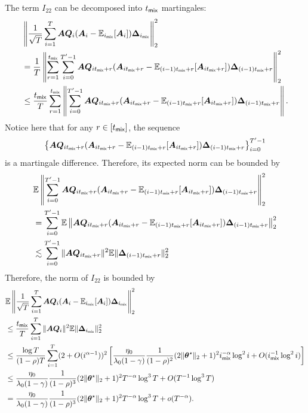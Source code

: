 The term $I_{22}$ can be decomposed into $t_{\mathsf{mix}}$ martingales:%
\begin{align*}
&\left\|\frac{1}{\sqrt{T}}\sum_{i=1}^T \bm{AQ}_i(\bm{A}_i - \mathbb{E}_{i_{\mathsf{mix}}}[\bm{A}_i])\bm{\Delta}_{i_{\mathsf{mix}}}\right\|_2^2   \\
&= \frac{1}{T}\left\|\sum_{r=1}^{t_{\mathsf{mix}}} \sum_{i=0}^{T'-1} \bm{AQ}_{it_{\mathsf{mix}} + r}(\bm{A}_{it_{\mathsf{mix}} + r} - \mathbb{E}_{(i-1)t_{\mathsf{mix}} + r}[\bm{A}_{it_{\mathsf{mix}} + r}])\bm{\Delta}_{(i-1)t_{\mathsf{mix}} + r}\right\|_2^2 \\ 
&\leq \frac{t_{\mathsf{mix}}}{T} \sum_{r=1}^{t_{\mathsf{mix}}} \left\|\sum_{i=0}^{T'-1} \bm{AQ}_{it_{\mathsf{mix}} + r}(\bm{A}_{it_{\mathsf{mix}} + r} - \mathbb{E}_{(i-1)t_{\mathsf{mix}} + r}[\bm{A}_{it_{\mathsf{mix}} + r}])\bm{\Delta}_{(i-1)t_{\mathsf{mix}} + r}\right\|.
\end{align*}
Notice here that for any $r \in [t_{\mathsf{mix}}]$, the sequence
\begin{align*}
\left\{\bm{AQ}_{it_{\mathsf{mix}} + r}(\bm{A}_{it_{\mathsf{mix}} + r} - \mathbb{E}_{(i-1)t_{\mathsf{mix}} + r}[\bm{A}_{it_{\mathsf{mix}} + r}])\bm{\Delta}_{(i-1)t_{\mathsf{mix}} + r}\right\}_{i=0}^{T'-1}
\end{align*}
is a martingale difference. Therefore, its expected norm can be bounded by
\begin{align*}
&\mathbb{E}\left\|\sum_{i=0}^{T'-1}\bm{AQ}_{it_{\mathsf{mix}} + r}(\bm{A}_{it_{\mathsf{mix}} + r} - \mathbb{E}_{(i-1)t_{\mathsf{mix}} + r}[\bm{A}_{it_{\mathsf{mix}} + r}])\bm{\Delta}_{(i-1)t_{\mathsf{mix}} + r}\right\|_2^2 \\ 
&= \sum_{i=0}^{T'-1} \mathbb{E}\left\|\bm{AQ}_{it_{\mathsf{mix}} + r}(\bm{A}_{it_{\mathsf{mix}} + r} - \mathbb{E}_{(i-1)t_{\mathsf{mix}} + r}[\bm{A}_{it_{\mathsf{mix}} + r}])\bm{\Delta}_{(i-1)t_{\mathsf{mix}} + r} \right\|_2^2 \\ 
&\lesssim  \sum_{i=0}^{T'-1} \|\bm{AQ}_{it_{\mathsf{mix}} + r}\|^2 \mathbb{E}\|\bm{\Delta}_{(i-1)t_{\mathsf{mix}} + r}\|_2^2 
\end{align*}
Therefore, the norm of $I_{22}$ is bounded by
\begin{align}
\label{eq:markov-CLT-I22-bound}
&\mathbb{E}\left\|\frac{1}{\sqrt{T}}\sum_{i=1}^T \bm{AQ}_i(\bm{A}_i - \mathbb{E}_{i_{\mathsf{mix}}}[\bm{A}_i])\bm{\Delta}_{i_{\mathsf{mix}}}\right\|_2^2 \nonumber \\
&\leq \frac{t_{\mathsf{mix}}}{T}  \sum_{i=1}^T \|\bm{AQ}_i\|^2\mathbb{E}\|\bm{\Delta}_{i_{\mathsf{mix}}}\|_2^2 \nonumber \\ 
&\leq \frac{\log T}{(1-\rho) T} \sum_{i=1}^T (2+O(i^{\alpha-1}))^2  \left[\frac{\eta_0}{\lambda_0(1-\gamma)} \frac{1}{(1-\rho)^2} (2\|\bm{\theta}^\star\|_2+1)^2 i_{\mathsf{mix}}^{-\alpha} \log^2 i + O(i_{\mathsf{mix}}^{-1} \log^2 i)\right] \nonumber \\ 
&\leq \frac{\eta_0}{\lambda_0(1-\gamma)} \frac{1}{(1-\rho)^3}  (2\|\bm{\theta}^\star\|_2+1)^2 T^{-\alpha} \log^3 T + O(T^{-1}\log^3 T)\nonumber \\ 
&= \frac{\eta_0}{\lambda_0(1-\gamma)} \frac{1}{(1-\rho)^3}  (2\|\bm{\theta}^\star\|_2+1)^2 T^{-\alpha} \log^3 T + o(T^{-\alpha}).
\end{align}

